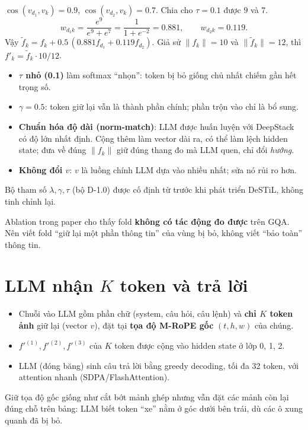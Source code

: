 \documentclass[11pt,a4paper]{article}
\begin{document}
\begin{vidu}
$\cos(v_{d_1},v_k)=0.9$, $\cos(v_{d_2},v_k)=0.7$. Chia cho $\tau=0.1$ được $9$ và $7$.
\[
w_{d_1k}=\frac{e^9}{e^9+e^7}=\frac{1}{1+e^{-2}}=0.881,\qquad w_{d_2k}=0.119.
\]
Vậy $\tilde f_k=f_k+0.5\,(0.881f_{d_1}+0.119f_{d_2})$. Giả sử $\|f_k\|=10$ và $\|\tilde f_k\|=12$, thì $f'_k=\tilde f_k\cdot10/12$.
\end{vidu}

\begin{visao}
\begin{itemize}
\item \textbf{$\tau$ nhỏ (0.1)} làm softmax ``nhọn'': token bị bỏ giống chủ nhất chiếm gần hết trọng số.
\item \textbf{$\gamma=0.5$}: token giữ lại vẫn là thành phần chính; phần trộn vào chỉ là bổ sung.
\item \textbf{Chuẩn hóa độ dài (norm-match)}: LLM được huấn luyện với DeepStack có độ lớn nhất định. Cộng thêm làm vector dài ra, có thể làm lệch hidden state; đưa về đúng $\|f_k\|$ giữ đúng thang đo mà LLM quen, chỉ đổi \emph{hướng}.
\item \textbf{Không đổi $v$}: $v$ là luồng chính LLM dựa vào nhiều nhất; sửa nó rủi ro hơn.
\end{itemize}
Bộ tham số $\lambda,\gamma,\tau$ (bộ D-1.0) được cố định từ trước khi phát triển DeSTiL, không tinh chỉnh lại.
\end{visao}

\begin{luuy}
Ablation trong paper cho thấy fold \textbf{không có tác động đo được} trên GQA. Nên viết fold ``giữ lại một phần thông tin'' của vùng bị bỏ, không viết ``bảo toàn'' thông tin.
\end{luuy}

\section{LLM nhận $K$ token và trả lời}
\begin{itemize}[leftmargin=*]
\item Chuỗi vào LLM gồm phần chữ (system, câu hỏi, câu lệnh) và \textbf{chỉ $K$ token ảnh} giữ lại (vector $v$), đặt tại \textbf{tọa độ M-RoPE gốc} $(t,h,w)$ của chúng.
\item $f'^{(1)},f'^{(2)},f'^{(3)}$ của $K$ token được cộng vào hidden state ở lớp 0, 1, 2.
\item LLM (đóng băng) sinh câu trả lời bằng greedy decoding, tối đa 32 token, với attention nhanh (SDPA/FlashAttention).
\end{itemize}
\begin{trucgiac}
Giữ tọa độ gốc giống như cắt bớt mảnh ghép nhưng vẫn đặt các mảnh còn lại đúng chỗ trên bảng: LLM biết token ``xe'' nằm ở góc dưới bên trái, dù các ô xung quanh đã bị bỏ.
\end{trucgiac}
\end{document}
